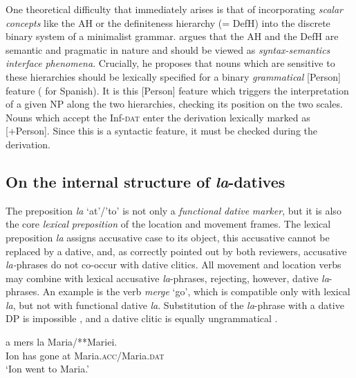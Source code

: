 \documentclass[output=paper,modfonts,nonflat,newtxmath]{langsci/langscibook}
\begin{document}
One theoretical difficulty that immediately arises is that of incorporating \textit{scalar} \textit{concepts} like the AH or the definiteness hierarchy (= DefH) into the discrete binary system of a minimalist grammar. \citet{Richards2008} argues that the AH and the DefH are semantic and pragmatic in nature and should be viewed as \textit{syntax-semantics} \textit{interface} \textit{phenomena}. Crucially, he proposes that nouns which are sensitive to these hierarchies should be lexically specified for a binary \textit{grammatical} [Person] feature (\citealt{Rodríguez-Mondoñedo2007} for Spanish). It is this [Person] feature which triggers the interpretation of a given NP along the two hierarchies, checking its position on the two scales. Nouns which accept the Inf-\textsc{dat} enter the derivation lexically marked as [+Person]. Since this is a syntactic feature, it must be checked during the derivation. 

\subsection{ On the internal structure of \textit{la}-datives}

The preposition \textit{la} ‘at’/’to’ is not only a \textit{functional} \textit{dative} \textit{marker}, but it is also the core \textit{lexical} \textit{preposition} of the location and movement frames. The lexical preposition \textit{la} assigns accusative case to its object, this accusative cannot be replaced by a dative, and, as correctly pointed out by both reviewers, accusative \textit{la-}phrases do not co-occur with dative clitics. All movement and location verbs may combine with lexical accusative \textit{la}{}-phrases, rejecting, however, dative \textit{la}{}-phrases. An example is the verb \textit{merge} ‘go’, which is compatible only with lexical \textit{la}, but not with functional dative \textit{la}. Substitution of the \textit{la}{}-phrase with a dative DP is impossible , and a dative clitic is equally ungrammatical .

\ea%
    \label{ex:cornilescu:9}
    \ea \label{ex:cornilescu:9a}
     {a} {mers} {la} Maria/**Mariei.	\\
    		Ion has gone at Maria.\textsc{acc}/Maria.\textsc{dat}\\
    \glt ‘Ion went to Maria.’
    \z 
    \z
\end{document}
